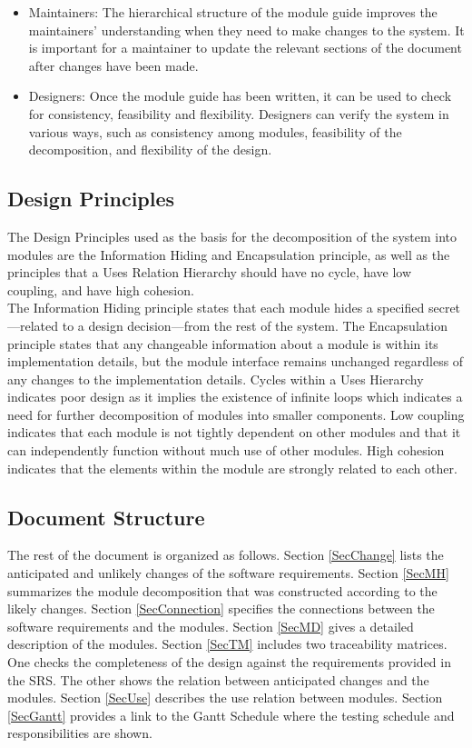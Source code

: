 \documentclass[12pt, titlepage]{article}
\begin{document}
\begin{itemize}
\item Maintainers: The hierarchical structure of the module guide improves the
  maintainers' understanding when they need to make changes to the system. It is
  important for a maintainer to update the relevant sections of the document
  after changes have been made.
\item Designers: Once the module guide has been written, it can be used to
  check for consistency, feasibility and flexibility. Designers can verify the
  system in various ways, such as consistency among modules, feasibility of the
  decomposition, and flexibility of the design.
\end{itemize}

\subsection{Design Principles}
The Design Principles used as the basis for the decomposition of the system into modules are the Information Hiding and Encapsulation principle, as well as the principles that a Uses Relation Hierarchy should have no cycle, have low coupling, and have high cohesion. \\

\noindent The Information Hiding principle states that each module hides a specified secret—related to a design decision—from the rest of the system. The Encapsulation principle states that any changeable information about a module is within its implementation details, but the module interface remains unchanged regardless of any changes to the implementation details. Cycles within a Uses Hierarchy indicates poor design as it implies the existence of infinite loops which indicates a need for further decomposition of modules into smaller components. Low coupling indicates that each module is not tightly dependent on other modules and that it can independently function without much use of other modules. High cohesion indicates that the elements within the module are strongly related to each other.

\subsection{Document Structure}
The rest of the document is organized as follows. Section
\ref{SecChange} lists the anticipated and unlikely changes of the software
requirements. Section \ref{SecMH} summarizes the module decomposition that
was constructed according to the likely changes. Section \ref{SecConnection}
specifies the connections between the software requirements and the
modules. Section \ref{SecMD} gives a detailed description of the
modules. Section \ref{SecTM} includes two traceability matrices. One checks
the completeness of the design against the requirements provided in the SRS. The
other shows the relation between anticipated changes and the modules. Section
\ref{SecUse} describes the use relation between modules. Section \ref{SecGantt} 
provides a link to the Gantt Schedule where the testing schedule and responsibilities
are shown.
\end{document}
